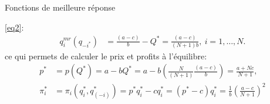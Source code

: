 \begin{frame}[allowframebreaks]{Fonctions de meilleure réponse}
\begin{itemize}
            \eqref{eq2}:
            \begin{align*} 
                q_i^{mr}(q_{-i^*}) &= \frac{(a-c)}{b} - Q^* = \frac{(a-c)}{(N+1)b}, \ i=1, \ldots, N.
            \end{align*}
            ce qui permets de calculer le prix et profits à l'équilibre: 
            \begin{align*}
                p^* &=p(Q^*) = a-bQ^* = a-b\left(\frac{N}{(N+1)}\frac{(a-c)}{b}\right)=\frac{a+Nc}{N+1},\\
                \pi_i^* &=\pi_i(q_i^*,q_{(-i)}^*)=p^*q_i^* - cq_i^* = (p^*-c)q_i^* =\frac{1}{b}\left(\frac{a-c}{N+1}\right)^2
            \end{align*}    
    \end{itemize}
\end{frame}

